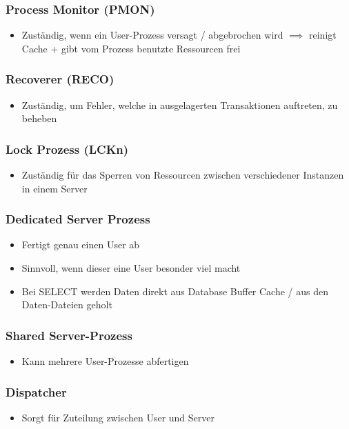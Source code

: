 \subsubsection{Process Monitor (PMON)}
\begin{itemize}
    \item Zuständig, wenn ein User-Prozess versagt / abgebrochen wird $\implies$ reinigt Cache + gibt vom Prozess benutzte Ressourcen frei
\end{itemize}

\subsubsection{Recoverer (RECO)}
\begin{itemize}
    \item Zuständig, um Fehler, welche in ausgelagerten Transaktionen auftreten, zu beheben
\end{itemize}

\subsubsection{Lock Prozess (LCKn)}
\begin{itemize}
    \item Zuständig für das Sperren von Ressourcen zwischen verschiedener Instanzen in einem Server
\end{itemize}

\subsubsection{Dedicated Server Prozess}
\begin{itemize}
    \item Fertigt genau einen User ab
    \item Sinnvoll, wenn dieser eine User besonder viel macht
    \item Bei SELECT werden Daten direkt aus Database Buffer Cache / aus den Daten-Dateien geholt
\end{itemize}

\subsubsection{Shared Server-Prozess}
\begin{itemize}
    \item Kann mehrere User-Prozesse abfertigen
\end{itemize}

\subsubsection{Dispatcher}
\begin{itemize}
    \item Sorgt für Zuteilung zwischen User und Server
\end{itemize}

